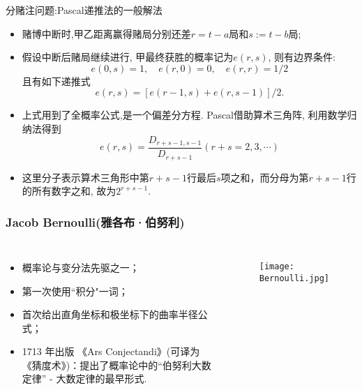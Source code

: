 \begin{frame}{分赌注问题:{\rm Pascal}递推法的一般解法}
\begin{itemize}[<+-|alert@+>]
	\item 赌博中断时,甲乙距离赢得赌局分别还差$r=t-a$局和$s:=t-b$局;
	\item 假设中断后赌局继续进行, 甲最终获胜的概率记为$e(r,s)$, 则有边界条件:
	\[e(0,s)=1,\quad e(r,0)=0,\quad e(r,r)=1/2\]且有如下递推式
	\[e(r,s)=[e(r-1,s)+e(r,s-1)]/2.\]
	\item 上式用到了全概率公式,是一个偏差分方程. Pascal借助算术三角阵, 利用数学归纳法得到
	\[
	e(r, s)=\frac{D_{r+s-1, s-1}}{D_{r+s-1}} (r+s=2,3, \cdots)
	\]
	\item 这里分子表示算术三角形中第${r+s-1}$行最后${s}$项之和，而分母为第${r+s-1}$行的所有数字之和, 故为${2^{r+s-1}}$.
\end{itemize}


\end{frame}





\begin{frame}
  \frametitle{{\rm Jacob Bernoulli}(雅各布·伯努利)}
  \begin{columns}
    \column{6cm}
    \begin{itemize}[<+-|alert@+>]
    \item 概率论与变分法先驱之一；
    \item 第一次使用``积分"一词；
    \item 首次给出直角坐标和极坐标下的曲率半径公式；
    \item 1713 年出版 《Ars Conjectandi》(可译为《猜度术》)：提出了概率论中的“伯努利大数定律” - 大数定律的最早形式.
    \end{itemize}

    \column{5cm}

    \begin{figure}[htbp]
      \centering
      \texttt{[image: Bernoulli.jpg]}
    \end{figure}
  \end{columns}
\end{frame}




